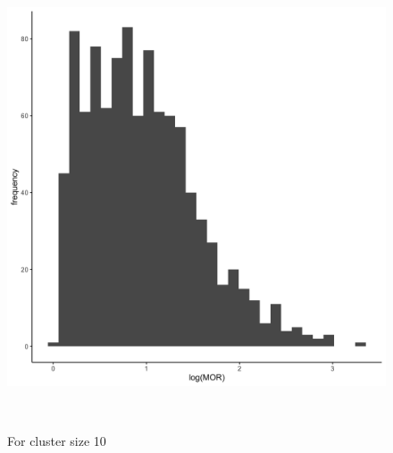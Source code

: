 \documentclass[
  letterpaper,
  DIV=11,
  numbers=noendperiod,
  titlepage]{scrartcl}
\begin{document}
\begin{figure}
\begin{minipage}[t]{0.50\linewidth}
{{\includegraphics{../../plots/two-lvl-ran-slope/high-prev/hist_10_10_two_lvl_slp_high_prev.png}

}

\caption{For cluster size 10}

}

\end{minipage}%
\newline
\begin{minipage}[t]{\linewidth}

{\centering 

~

}

\end{minipage}%
\newline
\begin{minipage}[t]{0.50\linewidth}

{\centering 

\raisebox{-\height}{

}}
\end{minipage}
\end{figure}
\end{document}
